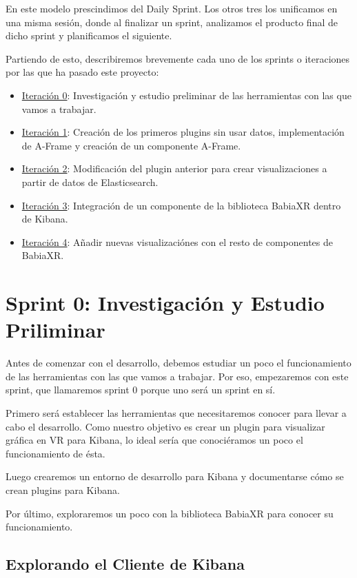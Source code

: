 \documentclass[a4paper, 12pt]{book}
\begin{document}
En este modelo prescindimos del Daily Sprint. Los otros tres los unificamos en una misma sesión, donde al finalizar un sprint, analizamos el producto final de dicho sprint y planificamos el siguiente. 


Partiendo de esto, describiremos brevemente cada uno de los sprints o iteraciones por las que ha pasado este proyecto:

\begin{itemize}
    \item \underline{Iteración 0}: Investigación y estudio preliminar de las herramientas con las que vamos a trabajar.
    \item \underline{Iteración 1}: Creación de los primeros plugins sin usar datos, implementación de A-Frame y creación de un componente A-Frame.
    \item \underline{Iteración 2}: Modificación del plugin anterior para crear visualizaciones a partir de datos de Elasticsearch.
    \item \underline{Iteración 3}: Integración de un componente de la biblioteca BabiaXR dentro de Kibana.
    \item \underline{Iteración 4}: Añadir nuevas visualizaciónes con el resto de componentes de BabiaXR.
\end{itemize}



\section{Sprint 0: Investigación y Estudio Priliminar }
\label{sec:sprint0}

Antes de comenzar con el desarrollo, debemos estudiar un poco el funcionamiento de las herramientas con las que vamos a trabajar. Por eso, empezaremos con este sprint, que llamaremos sprint 0 porque uno será un sprint en sí. 

Primero será establecer las herramientas que necesitaremos conocer para llevar a cabo el desarrollo. Como nuestro objetivo es crear un plugin para visualizar gráfica en VR para Kibana, lo ideal sería que conociéramos un poco el funcionamiento de ésta. 

Luego crearemos un entorno de desarrollo para Kibana y documentarse cómo se crean plugins para Kibana.

Por último, exploraremos un poco con la biblioteca BabiaXR para conocer su funcionamiento.


\subsection{Explorando el Cliente de Kibana}
\end{document}
